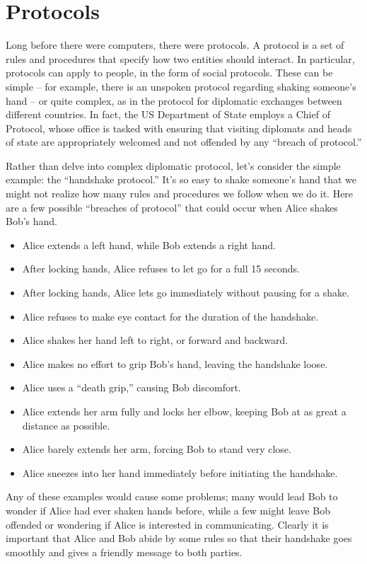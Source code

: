 \section{Protocols}

Long before there were computers, there were protocols. A protocol is a set of rules and procedures that specify how two entities should interact. In particular, protocols can apply to people, in the form of social protocols. These can be simple -- for example, there is an unspoken protocol regarding shaking someone's hand -- or quite complex, as in the protocol for diplomatic exchanges between different countries. In fact, the US Department of State employs a Chief of Protocol, whose office is tasked with ensuring that visiting diplomats and heads of state are appropriately welcomed and not offended by any ``breach of protocol.''

Rather than delve into complex diplomatic protocol, let's consider the simple example: the ``handshake protocol.'' It's so easy to shake someone's hand that we might not realize how many rules and procedures we follow when we do it. Here are a few possible ``breaches of protocol'' that could occur when Alice shakes Bob's hand.
\begin{itemize}
    \item Alice extends a left hand, while Bob extends a right hand.
    \item After locking hands, Alice refuses to let go for a full 15 seconds.
    \item After locking hands, Alice lets go immediately without pausing for a shake.
    \item Alice refuses to make eye contact for the duration of the handshake.
    \item Alice shakes her hand left to right, or forward and backward.
    \item Alice makes no effort to grip Bob's hand, leaving the handshake loose.
    \item Alice uses a ``death grip,'' causing Bob discomfort.
    \item Alice extends her arm fully and locks her elbow, keeping Bob at as great a distance as possible.
    \item Alice barely extends her arm, forcing Bob to stand very close.
    \item Alice sneezes into her hand immediately before initiating the handshake.
\end{itemize}
Any of these examples would cause some problems; many would lead Bob to wonder if Alice had ever shaken hands before, while a few might leave Bob offended or wondering if Alice is interested in communicating. Clearly it is important that Alice and Bob abide by some rules so that their handshake goes smoothly and gives a friendly message to both parties.

